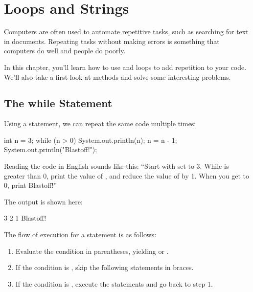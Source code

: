 \chapter{Loops and Strings}

Computers are often used to automate repetitive tasks, such as searching for text in documents.
Repeating tasks without making errors is something that computers do well and people do poorly.

In this chapter, you'll learn how to use  and  loops to add repetition to your code.
We'll also take a first look at  methods and solve some interesting problems.



\section{The while Statement}


Using a  statement, we can repeat the same code multiple times:

\begin{code}
int n = 3;
while (n > 0) {
    System.out.println(n);
    n = n - 1;
}
System.out.println("Blastoff!");
\end{code}

Reading the code in English sounds like this: ``Start with  set to 3.
While  is greater than 0, print the value of , and reduce the value of  by 1.
When you get to 0, print Blastoff!''

The output is shown here:

\begin{stdout}
3
2
1
Blastoff!
\end{stdout}

The flow of execution for a  statement is as follows:

\begin{enumerate}

\item Evaluate the condition in parentheses, yielding  or .

\item If the condition is , skip the following statements in braces.

\item If the condition is , execute the statements and go back to step 1.

\end{enumerate}

